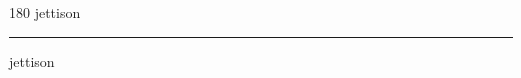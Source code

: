 
\begin{frame}
\begin{center}
\begin{turn}{180}
{\fontsize{2.5cm}{1em}\selectfont jettison}
\end{turn}
\vspace{1em}\par  
\hrule
\vspace{1em}\par  
{\fontsize{2.5cm}{1em}\selectfont jettison}
\end{center}
\end{frame}
